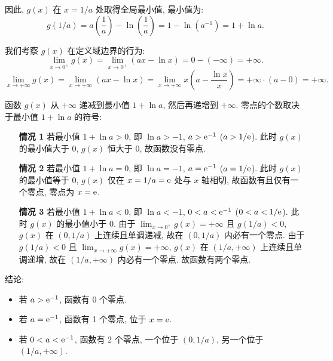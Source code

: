 \begin{solution}
\begin{enumerate}
              因此, $g(x)$ 在 $x = 1/a$ 处取得全局最小值, 最小值为:
              $$ g(1/a) = a\left(\frac{1}{a}\right) - \ln\left(\frac{1}{a}\right) = 1 - \ln(a^{-1}) = 1 + \ln a. $$

              我们考察 $g(x)$ 在定义域边界的行为:
              $$ \lim_{x \to 0^+} g(x) = \lim_{x \to 0^+} (ax - \ln x) = 0 - (-\infty) = +\infty. $$
              $$ \lim_{x \to +\infty} g(x) = \lim_{x \to +\infty} (ax - \ln x) = \lim_{x \to +\infty} x \left(a - \frac{\ln x}{x}\right) = +\infty \cdot (a - 0) = +\infty. $$

              函数 $g(x)$ 从 $+\infty$ 递减到最小值 $1+\ln a$, 然后再递增到 $+\infty$. 零点的个数取决于最小值 $1+\ln a$ 的符号:

              \begin{enumerate}
                  \item[\textbf{情况 1}] 若最小值 $1 + \ln a > 0$, 即 $\ln a > -1$, $a > \mathrm{e}^{-1}$ ($a > 1/\mathrm{e}$).
                      此时 $g(x)$ 的最小值大于 0, $g(x)$ 恒大于 0, 故函数没有零点.

                  \item[\textbf{情况 2}] 若最小值 $1 + \ln a = 0$, 即 $\ln a = -1$, $a = \mathrm{e}^{-1}$ ($a = 1/\mathrm{e}$).
                      此时 $g(x)$ 的最小值等于 0, $g(x)$ 仅在 $x=1/a = \mathrm{e}$ 处与 $x$ 轴相切, 故函数有且仅有一个零点, 零点为 $x=\mathrm{e}$.

                  \item[\textbf{情况 3}] 若最小值 $1 + \ln a < 0$, 即 $\ln a < -1$, $0 < a < \mathrm{e}^{-1}$ ($0 < a < 1/\mathrm{e}$).
                      此时 $g(x)$ 的最小值小于 0.
                      由于 $\lim_{x \to 0^+} g(x) = +\infty$ 且 $g(1/a) < 0$, $g(x)$ 在 $(0, 1/a)$ 上连续且单调递减, 故在 $(0, 1/a)$ 内必有一个零点.
                      由于 $g(1/a) < 0$ 且 $\lim_{x \to +\infty} g(x) = +\infty$, $g(x)$ 在 $(1/a, +\infty)$ 上连续且单调递增, 故在 $(1/a, +\infty)$ 内必有一个零点.
                      故函数有两个零点.
              \end{enumerate}

              结论:
              \begin{itemize}
                  \item 若 $a > \mathrm{e}^{-1}$, 函数有 0 个零点.
                  \item 若 $a = \mathrm{e}^{-1}$, 函数有 1 个零点, 位于 $x = \mathrm{e}$.
                  \item 若 $0 < a < \mathrm{e}^{-1}$, 函数有 2 个零点, 一个位于 $(0, 1/a)$, 另一个位于 $(1/a, +\infty)$.
              \end{itemize}

    \end{enumerate}
\end{solution}

